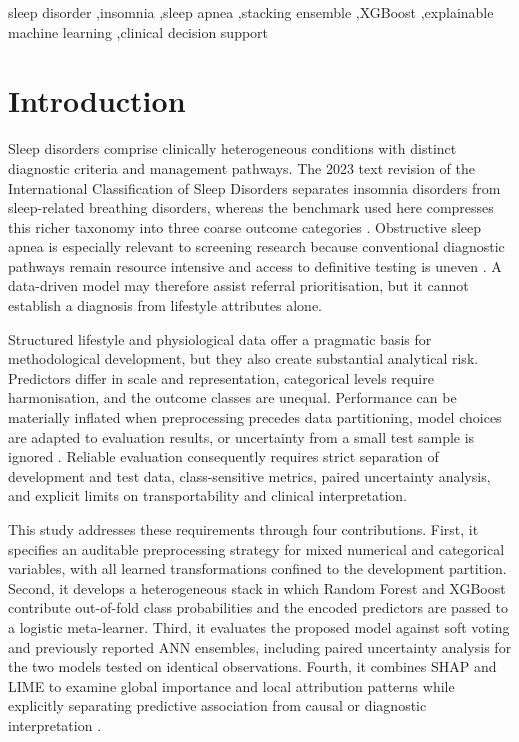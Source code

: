 ﻿\documentclass[preprint,12pt]{elsarticle}
\begin{document}
\begin{frontmatter}
\begin{keyword}
sleep disorder \sep insomnia \sep sleep apnea \sep stacking ensemble \sep XGBoost \sep explainable machine learning \sep clinical decision support
\end{keyword}
\end{frontmatter}

\section{Introduction}
Sleep disorders comprise clinically heterogeneous conditions with distinct diagnostic criteria and management pathways. The 2023 text revision of the International Classification of Sleep Disorders separates insomnia disorders from sleep-related breathing disorders, whereas the benchmark used here compresses this richer taxonomy into three coarse outcome categories \cite{aasm2023}. Obstructive sleep apnea is especially relevant to screening research because conventional diagnostic pathways remain resource intensive and access to definitive testing is uneven \cite{korkalainen2024,giorgi2025,bazoukis2023}. A data-driven model may therefore assist referral prioritisation, but it cannot establish a diagnosis from lifestyle attributes alone.

Structured lifestyle and physiological data offer a pragmatic basis for methodological development, but they also create substantial analytical risk. Predictors differ in scale and representation, categorical levels require harmonisation, and the outcome classes are unequal. Performance can be materially inflated when preprocessing precedes data partitioning, model choices are adapted to evaluation results, or uncertainty from a small test sample is ignored \cite{kapoor2023,efthimiou2024,collins2024}. Reliable evaluation consequently requires strict separation of development and test data, class-sensitive metrics, paired uncertainty analysis, and explicit limits on transportability and clinical interpretation.

This study addresses these requirements through four contributions. First, it specifies an auditable preprocessing strategy for mixed numerical and categorical variables, with all learned transformations confined to the development partition. Second, it develops a heterogeneous stack in which Random Forest and XGBoost contribute out-of-fold class probabilities and the encoded predictors are passed to a logistic meta-learner. Third, it evaluates the proposed model against soft voting and previously reported ANN ensembles, including paired uncertainty analysis for the two models tested on identical observations. Fourth, it combines SHAP and LIME to examine global importance and local attribution patterns while explicitly separating predictive association from causal or diagnostic interpretation \cite{jung2023,allen2024,pesapane2026}.
\end{document}
